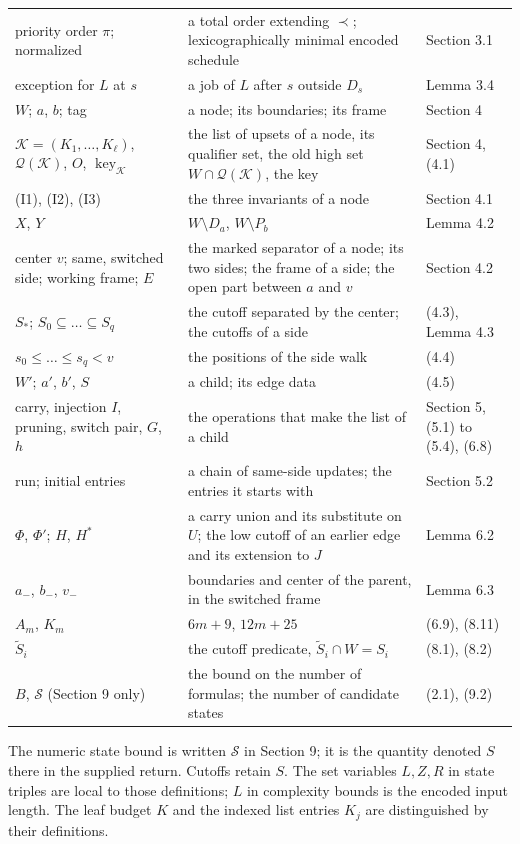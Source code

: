 {\begin{longtable}{@{}L{4.0cm}L{8.2cm}L{2.5cm}@{}}
priority order $\pi$; normalized & a total order extending $\prec$; lexicographically minimal encoded schedule & Section 3.1 \\
exception for $L$ at $s$ & a job of $L$ after $s$ outside $D_s$ & Lemma 3.4 \\
$W$; $a$, $b$; tag & a node; its boundaries; its frame & Section 4 \\
$\mathcal K=(K_1,\dots,K_\ell)$, $\mathcal Q(\mathcal K)$, $O$, $\operatorname{key}_{\mathcal K}$ & the list of upsets of a node, its qualifier set, the old high set $W\cap\mathcal Q(\mathcal K)$, the key & Section 4, (4.1) \\
(I1), (I2), (I3) & the three invariants of a node & Section 4.1 \\
$X$, $Y$ & $W\setminus D_a$, $W\setminus P_b$ & Lemma 4.2 \\
center $v$; same, switched side; working frame; $E$ & the marked separator of a node; its two sides; the frame of a side; the open part between $a$ and $v$ & Section 4.2 \\
$S_*$; $S_0\subseteq\dots\subseteq S_q$ & the cutoff separated by the center; the cutoffs of a side & (4.3), Lemma 4.3 \\
$s_0\leq\dots\leq s_q<v$ & the positions of the side walk & (4.4) \\
$W'$; $a'$, $b'$, $S$ & a child; its edge data & (4.5) \\
carry, injection $I$, pruning, switch pair, $G$, $h$ & the operations that make the list of a child & Section 5, (5.1) to (5.4), (6.8) \\
run; initial entries & a chain of same-side updates; the entries it starts with & Section 5.2 \\
$\Phi$, $\Phi'$; $H$, $H^*$ & a carry union and its substitute on $U$; the low cutoff of an earlier edge and its extension to $J$ & Lemma 6.2 \\
$a_-$, $b_-$, $v_-$ & boundaries and center of the parent, in the switched frame & Lemma 6.3 \\
$A_m$, $K_m$ & $6m+9$, $12m+25$ & (6.9), (8.11) \\
$\widetilde S_i$ & the cutoff predicate, $\widetilde S_i\cap W=S_i$ & (8.1), (8.2) \\
$B$, $\mathcal{S}$ (Section 9 only) & the bound on the number of formulas; the number of candidate states & (2.1), (9.2) \\
\end{longtable}}

\noindent The numeric state bound is written $\mathcal{S}$ in Section 9; it is the quantity denoted $S$ there in the supplied return. Cutoffs retain $S$. The set variables $L,Z,R$ in state triples are local to those definitions; $L$ in complexity bounds is the encoded input length. The leaf budget $K$ and the indexed list entries $K_j$ are distinguished by their definitions.
